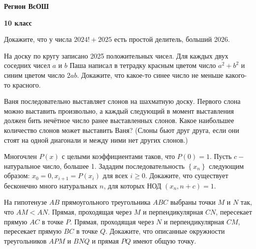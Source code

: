 \centerline{\bf \Huge Регион ВсОШ}
\centerline{\bf \Huge 10 класс}

\begin{flushright}
        \scriptsize{}
\end{flushright}

Докажите, что у числа $2024!+2025$ есть простой делитель, больший 2026.

На доску по кругу записано 2025 положительных чисел. Для каждых двух соседних чисел $a$ и $b$ Паша написал в тетрадку красным цветом число $a^2+b^2$ и синим цветом число $2 a b$. Докажите, что какое-то синее число не меньше какого-то красного.

Ваня последовательно выставляет слонов на шахматную доску. Первого слона можно выставить произвольно, а каждый следующий в момент выставления должен бить нечётное число ранее выставленных слонов. Какое наибольшее количество слонов может выставить Ваня? (Слоны бьют друг друга, если они стоят на одной диагонали и между ними нет других слонов.)

Многочлен $P(x)$ с целыми коэффициентами таков, что $P(0)=1$. Пусть $c-$ натуральное число, большее 1. Зададим последовательность $\left\{x_n\right\}$ следующим образом: $x_0=0, x_{i+1}=P\left(x_i\right)$ для всех $i \geqslant 0$. Докажите, что существует бесконечно много натуральных $n$, для которых НОД $\left(x_n, n+c\right)=1$.

На гипотенузе $A B$ прямоугольного треугольника $A B C$ выбраны точки $M$ и $N$ так, что $A M<A N$. Прямая, проходящая через $M$ и перпендикулярная $C N$, пересекает прямую $A C$ в точке $P$. Прямая, проходящая через $N$ и перпендикулярная $C M$, пересекает прямую $B C$ в точке $Q$. Докажите, что описанные окружности треугольников $A P M$ и $B N Q$ и прямая $P Q$ имеют общую точку.

